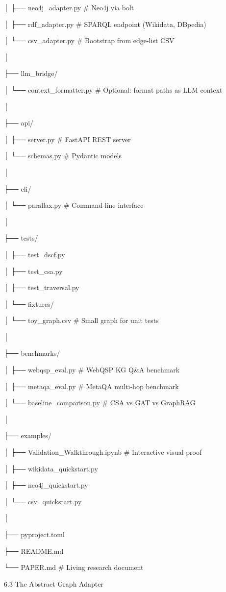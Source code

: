 \documentclass[10pt,journal,compsoc]{IEEEtran}
\begin{document}
│   ├── neo4j\_adapter.py        \# Neo4j via bolt

│   ├── rdf\_adapter.py          \# SPARQL endpoint (Wikidata, DBpedia)

│   └── csv\_adapter.py          \# Bootstrap from edge-list CSV

│

├── llm\_bridge/

│   └── context\_formatter.py    \# Optional: format paths as LLM context

│

├── api/

│   ├── server.py               \# FastAPI REST server

│   └── schemas.py              \# Pydantic models

│

├── cli/

│   └── parallax.py             \# Command-line interface

│

├── tests/

│   ├── test\_dscf.py

│   ├── test\_csa.py

│   ├── test\_traversal.py

│   └── fixtures/

│       └── toy\_graph.csv       \# Small graph for unit tests

│

├── benchmarks/

│   ├── webqsp\_eval.py          \# WebQSP KG Q\&A benchmark

│   ├── metaqa\_eval.py          \# MetaQA multi-hop benchmark

│   └── baseline\_comparison.py  \# CSA vs GAT vs GraphRAG

│

├── examples/

│   ├── Validation\_Walkthrough.ipynb \# Interactive visual proof

│   ├── wikidata\_quickstart.py

│   ├── neo4j\_quickstart.py

│   └── csv\_quickstart.py

│

├── pyproject.toml

├── README.md

└── PAPER.md                    \# Living research document

6.3 The Abstract Graph Adapter
\end{document}
